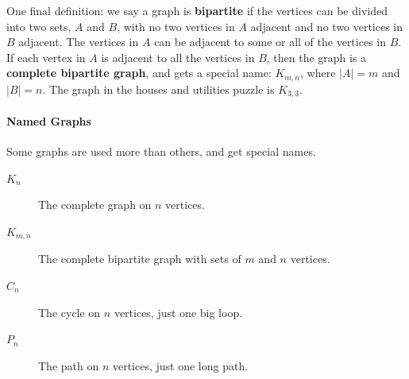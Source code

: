 \documentclass[10pt,]{book}
\newcommand{\terminology}[1]{\textbf{#1}}
\theoremstyle{plain}
\theoremstyle{definition}
\theoremstyle{definition}
\theoremstyle{definition}
\theoremstyle{definition}
\numberwithin{equation}{chapter}
\begin{document}
\hypertarget{p-74}{}%
One final definition: we say a graph is \terminology{bipartite} if the vertices can be divided into two sets, \(A\) and \(B\), with no two vertices in \(A\) adjacent and no two vertices in \(B\) adjacent. The vertices in \(A\) can be adjacent to some or all of the vertices in \(B\). If each vertex in \(A\) is adjacent to all the vertices in \(B\), then the graph is a \terminology{complete bipartite graph}, and gets a special name: \(K_{m,n}\), where \(|A| = m\) and \(|B| = n\). The graph in the houses and utilities puzzle is \(K_{3,3}\).%
\typeout{************************************************}
\typeout{************************************************}
\paragraph[{Named Graphs}]{Named Graphs}\hypertarget{paragraphs-5}{}
\hypertarget{p-75}{}%
Some graphs are used more than others, and get special names. \leavevmode%
\begin{description}
\item[{\(K_n\)}]\hypertarget{li-7}{}\hypertarget{p-76}{}%
The complete graph on \(n\) vertices.\label{notation-2}
%
\item[{\(K_{m,n}\)}]\hypertarget{li-8}{}\hypertarget{p-77}{}%
The complete bipartite graph with sets of \(m\) and \(n\) vertices. \label{notation-3}
%
\item[{\(C_n\)}]\hypertarget{li-9}{}\hypertarget{p-78}{}%
The cycle on \(n\) vertices, just one big loop. \label{notation-4}
%
\item[{\(P_n\)}]\hypertarget{li-10}{}\hypertarget{p-79}{}%
The path on \(n\) vertices, just one long path. \label{notation-5}
%
\end{description}
%
\end{document}
